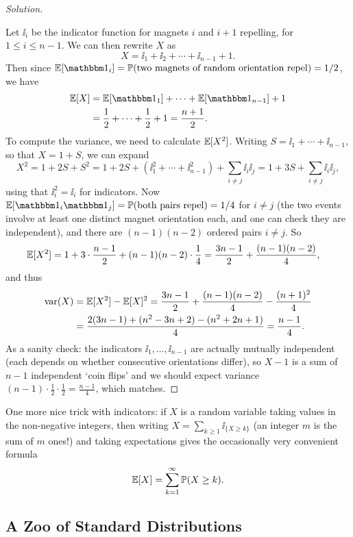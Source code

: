 \documentclass[a4paper]{scrartcl}
\begin{document}
\begin{proof}[Solution]
\begin{center}
	\end{center}
	Let $\ii_i$ be the indicator function for magnets $i$ and $i+1$ repelling, for $1 \leq i \leq n - 1$. We can then rewrite $X$ as 
	$$
	X = \ii_1 + \ii_2 + \cdots + \ii_{n - 1} + 1.
	$$
	Then since $\EE[\ii_i] = \PP(\text{two magnets of random orientation repel}) = 1/2$, we have
	\begin{align*}
		\EE[X] &= \EE[\ii_1] + \cdots + \EE[\ii_{n - 1}] + 1\\
		&= \frac{1}{2} + \cdots + \frac{1}{2} + 1 = \frac{n + 1}{2}.
	\end{align*}
	To compute the variance, we need to calculate $\mathbb{E}[X^2]$. Writing $S = \ii_1 + \cdots + \ii_{n-1}$, so that $X = 1 + S$, we can expand
	$$
	X^2 = 1 + 2S + S^2 = 1 + 2S + (\ii_1^2 + \cdots + \ii_{n-1}^2) + \sum_{i \neq j} \ii_i \ii_j = 1 + 3S + \sum_{i \neq j} \ii_i \ii_j,
	$$
	using that $\ii_i^2 = \ii_i$ for indicators. Now $\EE[\ii_i \ii_j] = \PP(\text{both pairs repel}) = 1/4$ for $i \neq j$ (the two events involve at least one distinct magnet orientation each, and one can check they are independent), and there are $(n-1)(n-2)$ ordered pairs $i \neq j$. So
	\begin{align*}
		\mathbb{E}[X^2] &= 1 + 3 \cdot \frac{n - 1}{2} + (n - 1)(n - 2)\cdot\frac{1}{4} = \frac{3n - 1}{2} + \frac{(n-1)(n-2)}{4},
	\end{align*}
	and thus
	\begin{align*}
		\operatorname{var}(X) &= \mathbb{E}[X^2] - \mathbb{E}[X]^2 = \frac{3n - 1}{2} + \frac{(n-1)(n-2)}{4} - \frac{(n + 1)^2}{4} \\
		&= \frac{2(3n - 1) + (n^2 - 3n + 2) - (n^2 + 2n + 1)}{4} = \frac{n - 1}{4}.
	\end{align*}
	As a sanity check: the indicators $\ii_1, \dots, \ii_{n-1}$ are actually mutually independent (each depends on whether consecutive orientations differ), so $X - 1$ is a sum of $n - 1$ independent `coin flips' and we should expect variance $(n-1) \cdot \frac{1}{2} \cdot \frac{1}{2} = \frac{n-1}{4}$, which matches.
\end{proof}

One more nice trick with indicators: if $X$ is a random variable taking values in the non-negative integers, then writing $X = \sum_{k \geq 1} \ii_{\{X \geq k\}}$ (an integer $m$ is the sum of $m$ ones!) and taking expectations gives the occasionally very convenient formula
$$
\mathbb{E}[X] = \sum_{k = 1}^{\infty} \mathbb{P}(X \geq k).
$$

\subsection{A Zoo of Standard Distributions}
\end{document}
